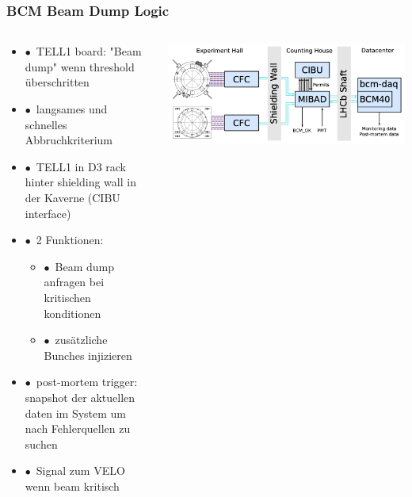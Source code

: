 \documentclass[aspectratio=1610, 12pt, xcolor=dvipsnames]{beamer}
\begin{document}
\begin{frame}\frametitle{BCM Beam Dump Logic}
  \begin{columns}
    \begin{column}[c]{0.48\textwidth}
      \begin{itemize}
        \item $\bullet$\, TELL1 board: "Beam dump" wenn threshold überschritten
        \item $\bullet$\, \to langsames und schnelles Abbruchkriterium
        \item $\bullet$\, TELL1 in D3 rack hinter shielding wall in der Kaverne (CIBU interface)
        \item $\bullet$\, 2 Funktionen:
        \begin{itemize}
          \item $\bullet$\, Beam dump anfragen bei kritischen konditionen
          \item $\bullet$\, zusätzliche Bunches injizieren
        \end{itemize}
        \item $\bullet$\, post-mortem trigger: snapshot der aktuellen daten im System um nach Fehlerquellen zu suchen
        \item $\bullet$\, Signal zum VELO wenn beam kritisch
      \end{itemize}
    \end{column}
    \begin{column}[c]{0.48\textwidth}
      \includegraphics[width=\textwidth]{plots/data_aquisition_chain.png}
    \end{column}
  \end{columns}
\end{frame}
\end{document}
